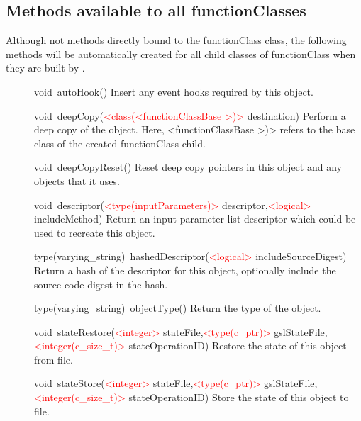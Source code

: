 \subsection{Methods available to all {\normalfont \ttfamily functionClass}es}\label{sec:functionClassAll}

Although not methods directly bound to the {\normalfont \ttfamily functionClass} class, the following methods will be automatically created for all child classes of {\normalfont \ttfamily functionClass} when they are built by \glc.

\begin{description}
\item[]{\normalfont \ttfamily void\ autoHook()}  Insert any event hooks required by this object. 

\item[]{\normalfont \ttfamily void\ deepCopy(\textcolor{red}{\textless class(\textless functionClassBase \textgreater)\textgreater} destination\arginout)}  Perform a deep copy of the object. Here, {\normalfont \ttfamily \textless functionClassBase \textgreater)\textgreater} refers to the base class of the created {\normalfont \ttfamily functionClass} child.

\item[]{\normalfont \ttfamily void\ deepCopyReset()}  Reset deep copy pointers in this object and any objects that it uses. 

\item[]{\normalfont \ttfamily void\ descriptor(\textcolor{red}{\textless type(inputParameters)\textgreater} descriptor\arginout,\textcolor{red}{\textless logical\textgreater} includeMethod\argin)}  Return an input parameter list descriptor which could be used to recreate this object. 

\item[]{\normalfont \ttfamily type(varying\_string)\ hashedDescriptor(\textcolor{red}{\textless logical\textgreater} includeSourceDigest\argin)}  Return a hash of the descriptor for this object, optionally include the source code digest in the hash. 

\item[]{\normalfont \ttfamily type(varying\_string)\ objectType()}  Return the type of the object. 

\item[]{\normalfont \ttfamily void\ stateRestore(\textcolor{red}{\textless integer\textgreater} stateFile\argin,\textcolor{red}{\textless type(c\_ptr)\textgreater} gslStateFile\argin,\textcolor{red}{\textless integer(c\_size\_t)\textgreater} stateOperationID\argin)}  Restore the state of this object from file. 

\item[]{\normalfont \ttfamily void\ stateStore(\textcolor{red}{\textless integer\textgreater} stateFile\argin,\textcolor{red}{\textless type(c\_ptr)\textgreater} gslStateFile\argin,\textcolor{red}{\textless integer(c\_size\_t)\textgreater} stateOperationID\argin)}  Store the state of this object to file. 
\end{description}
 

